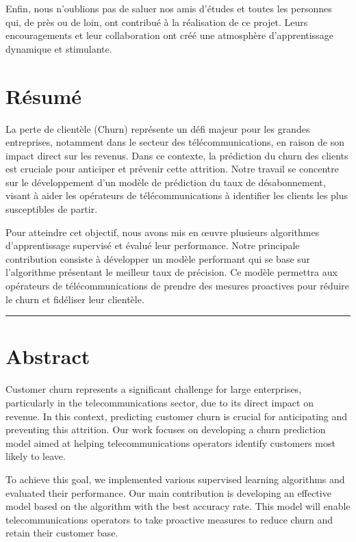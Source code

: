 \documentclass[a4paper,12pt]{report}
\begin{document}
Enfin, nous n'oublions pas de saluer nos amis d'études et toutes les personnes qui, de près ou de loin, ont contribué à la réalisation de ce projet. Leurs encouragements et leur collaboration ont créé une atmosphère d'apprentissage dynamique et stimulante.

\newpage

\chapter*{Résumé}
La perte de clientèle (Churn) représente un défi majeur pour les grandes entreprises, notamment dans le secteur des télécommunications, en raison de son impact direct sur les revenus. Dans ce contexte, la prédiction du churn des clients est cruciale pour anticiper et prévenir cette attrition. Notre travail se concentre sur le développement d'un modèle de prédiction du taux de désabonnement, visant à aider les opérateurs de télécommunications à identifier les clients les plus susceptibles de partir.

Pour atteindre cet objectif, nous avons mis en œuvre plusieurs algorithmes d'apprentissage supervisé et évalué leur performance. Notre principale contribution consiste à développer un modèle performant qui se base sur l'algorithme présentant le meilleur taux de précision. Ce modèle permettra aux opérateurs de télécommunications de prendre des mesures proactives pour réduire le churn et fidéliser leur clientèle.

\vspace{1cm}
\begin{center}
    \rule{0.6\textwidth}{0.5pt}
\end{center}
\vspace{1cm}

\chapter*{Abstract}
Customer churn represents a significant challenge for large enterprises, particularly in the telecommunications sector, due to its direct impact on revenue. In this context, predicting customer churn is crucial for anticipating and preventing this attrition. Our work focuses on developing a churn prediction model aimed at helping telecommunications operators identify customers most likely to leave.

To achieve this goal, we implemented various supervised learning algorithms and evaluated their performance. Our main contribution is developing an effective model based on the algorithm with the best accuracy rate. This model will enable telecommunications operators to take proactive measures to reduce churn and retain their customer base.
\end{document}
